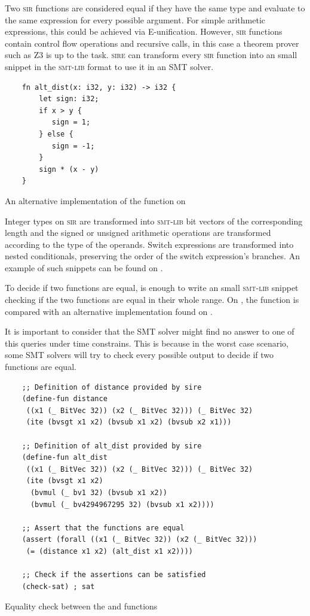 Two \textsc{sir} functions are considered equal if they have the same type and
evaluate to the same expression for every possible argument. For simple
arithmetic expressions, this could be achieved via E-unification. However,
\textsc{sir} functions contain control flow operations and recursive calls, in
this case a theorem prover such as Z3 is up to the task. \textsc{sire} can
transform every \textsc{sir} function into an small snippet in the
\textsc{smt-lib} format to use it in an SMT solver.

\begin{listing}[h]
    \begin{verbatim}
    fn alt_dist(x: i32, y: i32) -> i32 {
        let sign: i32; 
        if x > y {
           sign = 1;
        } else {
           sign = -1;
        }
        sign * (x - y)
    }
    \end{verbatim}
    \caption{An alternative implementation of the  function on }
  \label{lst:alt_distance}
\end{listing}

Integer types on \textsc{sir} are transformed into \textsc{smt-lib} bit vectors
of the corresponding length and the signed or unsigned arithmetic operations
are transformed according to the type of the operands. Switch expressions are
transformed into nested conditionals, preserving the order of the switch
expression's branches. An example of such snippets can be found on
. 

To decide if two functions are equal, is enough to write an small
\textsc{smt-lib} snippet checking if the two functions are equal in their whole
range. On , the  function is compared
with an alternative implementation found on . 

It is important to consider that the SMT solver might find no answer to one of
this queries under time constrains. This is because in the worst case scenario,
some SMT solvers will try to check every possible output to decide if two
functions are equal. 

\begin{listing}[H]
    \begin{verbatim}
    ;; Definition of distance provided by sire
    (define-fun distance 
     ((x1 (_ BitVec 32)) (x2 (_ BitVec 32))) (_ BitVec 32) 
     (ite (bvsgt x1 x2) (bvsub x1 x2) (bvsub x2 x1)))

    ;; Definition of alt_dist provided by sire
    (define-fun alt_dist 
     ((x1 (_ BitVec 32)) (x2 (_ BitVec 32))) (_ BitVec 32) 
     (ite (bvsgt x1 x2) 
      (bvmul (_ bv1 32) (bvsub x1 x2)) 
      (bvmul (_ bv4294967295 32) (bvsub x1 x2))))
    
    ;; Assert that the functions are equal
    (assert (forall ((x1 (_ BitVec 32)) (x2 (_ BitVec 32))) 
     (= (distance x1 x2) (alt_dist x1 x2)))) 

    ;; Check if the assertions can be satisfied
    (check-sat) ; sat
    \end{verbatim}
    \caption{Equality check between the  and  functions}
  \label{lst:func_equality}
\end{listing}


